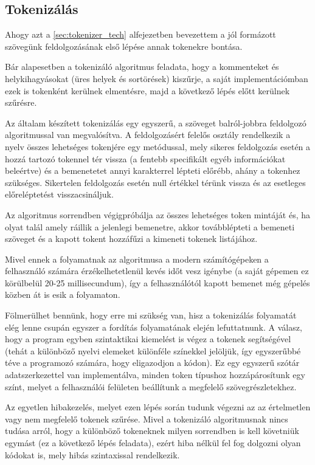 \subsection{Tokenizálás}
\label{sec:tokenizer}

Ahogy azt a \ref{sec:tokenizer_tech} alfejezetben bevezettem a jól formázott szövegünk feldolgozásának első lépése annak tokenekre bontása.

Bár alapesetben a tokenizáló algoritmus feladata, hogy a kommenteket és helykihagyásokat (üres helyek és sortörések) kiszűrje, a saját implementációmban ezek is tokenként kerülnek elmentésre, majd a következő lépés előtt kerülnek szűrésre.

Az általam készített tokenizálás egy egyszerű, a szöveget balról-jobbra feldolgozó algoritmussal van megvalósítva. A feldolgozásért felelős osztály rendelkezik a nyelv összes lehetséges tokenjére egy metódussal, mely sikeres feldolgozás esetén a hozzá tartozó tokennel tér vissza (a fentebb specifikált egyéb információkat beleértve) és a bemenetetet annyi karakterrel lépteti előrébb, ahány a tokenhez szükséges. Sikertelen feldolgozás esetén null értékkel térünk vissza és az esetleges előreléptetést visszacsináljuk.

Az algoritmus sorrendben végigpróbálja az összes lehetséges token mintáját és, ha olyat talál amely ráillik a jelenlegi bemenetre, akkor továbblépteti a bemeneti szöveget és a kapott tokent hozzáfűzi a kimeneti tokenek listájához.

Mivel ennek a folyamatnak az algoritmusa a modern számítógépeken a felhasználó számára érzékelhetetlenül kevés időt vesz igénybe (a saját gépemen ez körülbelül 20-25 millisecundum), így a felhasználótól kapott bemenet még gépelés közben át is esik a folyamaton. 

Fölmerülhet bennünk, hogy erre mi szükség van, hisz a tokenizálás folyamatát elég lenne csupán egyszer a fordítás folyamatának elején lefuttatnunk. A válasz, hogy a program egyben szintaktikai kiemelést is végez a tokenek segítségével (tehát a különböző nyelvi elemeket különféle színekkel jelöljük, így egyszerűbbé téve a programozó számára, hogy eligazodjon a kódon). Ez egy egyszerű szótár adatszerkezettel van implementálva, minden token típushoz hozzápárosítunk egy színt, melyet a felhasználói felületen beállítunk a megfelelő szövegrészletekhez.

Az egyetlen hibakezelés, melyet ezen lépés során tudunk végezni az az értelmetlen vagy nem megfelelő tokenek szűrése. Mivel a tokenizáló algoritmusnak nincs tudása arról, hogy a különböző tokeneknek milyen sorrendben is kell követniük egymást (ez a következő lépés feladata), ezért hiba nélkül fel fog dolgozni olyan kódokat is, mely hibás szintaxissal rendelkezik.

